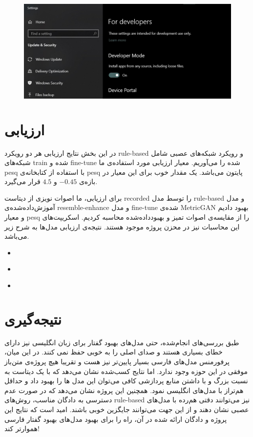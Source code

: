 \documentclass[fleqn]{report}
\begin{document}
\begin{figure}[h]

    \centering
    \includegraphics[width=\textwidth, keepaspectratio]{images/setting.jpg}
    
    \caption{}
    \label{fig:setting}
\end{figure}

\chapter{ارزیابی}
در این بخش نتایج ارزیابی هر دو رویکرد rule-based و رویکرد شبکه‌های عصبی شامل شبکه‌های train شده و fine-tune شده را می‌آوریم.
معیار ارزیابی مورد استفاده‌ی ما pesq با استفاده از کتابخانه‌ی pesq پایتون می‌باشد.
یک مقدار خوب برای این معیار در بازه‌ی $-0.45$ و $4.5$ قرار می‌گیرد.

برای ارزیابی، ما اصوات نویزی از دیتاست recorded را توسط مدل rule-based و مدل آموزش‌داده‌شده‌ی resemble-enhance و مدل fine-tune شده‌ی MetricGAN بهبود دادیم و 
معیار pesq را از مقایسه‌ی اصوات تمیز و بهبود‌داده‌شده محاسبه کردیم.
اسکریپت‌های این محاسبات نیز در محزن پروژه موجود هستند.
نتیجه‌ی ارزیابی مدل‌ها به شرح زیر می‌باشد.

\begin{itemize}
    \item \textbf{} 
    \item \textbf{} 
    \item \textbf{} 
\end{itemize}

\chapter{نتیجه‌گیری}
طبق بررسی‌های انجام‌شده، حتی مدل‌های بهبود گفتار برای زبان انگلیسی نیز دارای خطای بسیاری هستند و صدای اصلی را به خوبی حفظ نمی کنند.
در این میان، پرفورمنس مدل‌های فارسی بسیار پایین‌تر نیز هست و تقریبا هیچ پروژه‌ی متن‌باز موفقی در این حوزه وجود ندارد.
اما نتایج کسب‌شده نشان می‌دهد که با یک دیتاست به نسبت بزرگ و با داشتن منابع پردازشی کافی می‌توان این مدل ها را بهبود داد و حداقل هم‌تراز با مدل‌های انگلیسی نمود.
همچنین این پروژه نشان می‌دهد که در صورت عدم دسترسی به دادگان مناسب، روش‌های rule-based نیز می‌توانند دقتی هم‌رده با مدل‌های عصبی نشان دهند و از این جهت می‌توانند جایگزین خوبی باشند.
امید است که نتایج این پروژه و دادگان ارائه شده در آن، راه را برای بهبود مدل‌های بهبود گفتار فارسی هموارتر کند!
\end{document}
